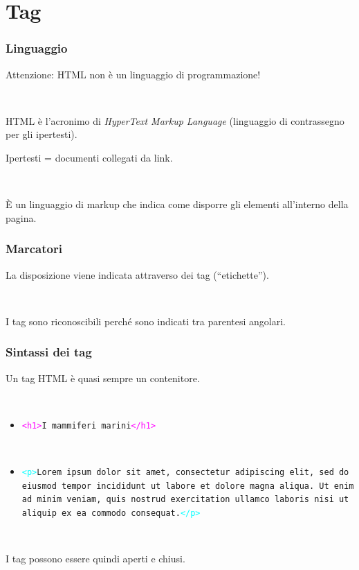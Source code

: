 \documentclass[]{beamer}
\begin{document}
\section{Tag}


\begin{frame}
\frametitle{Linguaggio}
Attenzione: \alert<1>{HTML non è un linguaggio di programmazione!}\pause

~

HTML è l'acronimo di \alert<2>{\emph{HyperText Markup Language}} (linguaggio di contrassegno per gli ipertesti).

Ipertesti = documenti collegati da link.\pause

~

È  un linguaggio di markup che indica \alert<3>{come disporre gli elementi} all'interno della pagina.
\end{frame}

\begin{frame}
\frametitle{Marcatori}
La disposizione viene indicata attraverso dei \alert<1>{tag} (``etichette'').\pause

~

I tag sono riconoscibili perché sono indicati tra \alert<2>{parentesi angolari}.

\begin{figure}
\end{figure}
\end{frame}

\begin{frame}
\frametitle{Sintassi dei tag}
Un tag HTML è quasi sempre un \alert<1>{contenitore}.\pause

~

\begin{itemize}
  \item \texttt{\textcolor{magenta}{<h1>}I mammiferi marini\textcolor{magenta}{</h1>}}
  
  ~
  
  \item \texttt{\textcolor{cyan}{<p>}Lorem ipsum dolor sit amet, consectetur adipiscing elit, sed do eiusmod tempor incididunt ut labore et dolore magna aliqua. Ut enim ad minim veniam, quis nostrud exercitation ullamco laboris nisi ut aliquip ex ea commodo consequat.\textcolor{cyan}{</p>}}
\end{itemize}

~

\pause
I tag possono essere quindi \alert<3>{aperti} e \alert<3>{chiusi}.
\end{frame}
\end{document}
